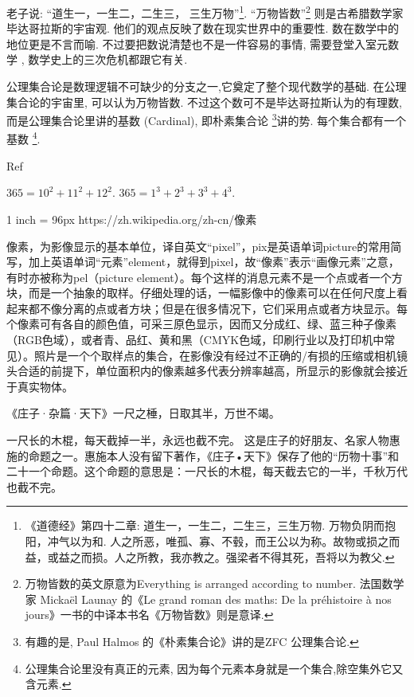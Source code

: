 \documentclass[main.tex]{subfiles}
\begin{document}
老子说: “道生一，一生二，二生三，
三生万物”\footnote{《道德经》第四十二章: 道生一，一生二，二生三，三生万物. 万物负阴而抱阳，冲气以为和. 人之所恶，唯孤、寡、不毂，而王公以为称。故物或损之而益，或益之而损。人之所教，我亦教之。强梁者不得其死，吾将以为教父.}.
“万物皆数”\footnote{万物皆数的英文原意为Everything is arranged according to number. 
	法国数学家 Mickaël Launay 的《Le grand roman des maths: De la préhistoire à nos jours》一书的中译本书名《万物皆数》则是意译.}
则是古希腊数学家毕达哥拉斯的宇宙观. 他们的观点反映了数在现实世界中的重要性. 数在数学中的地位更是不言而喻.
不过要把数说清楚也不是一件容易的事情, 需要登堂入室元数学
, 数学史上的三次危机都跟它有关. 

公理集合论是数理逻辑不可缺少的分支之一,它奠定了整个现代数学的基础. 在公理集合论的宇宙里, 可以认为万物皆数. 
不过这个数可不是毕达哥拉斯认为的有理数, 而是公理集合论里讲的基数 (Cardinal),
即朴素集合论
\footnote{有趣的是, Paul Halmos 的《朴素集合论》讲的是ZFC 公理集合论\cite{HalmosP}.}讲的势. 每个集合都有一个基数
\footnote{公理集合论里没有真正的元素,
因为每个元素本身就是一个集合,除空集外它又含元素.}.

Ref
\cite{JiangJi}


$365=10^2+11^2+12^2$.
$365=1^3+2^3+3^3+4^3$.


1 inch = 96px
https://zh.wikipedia.org/zh-cn/像素

像素，为影像显示的基本单位，译自英文“pixel”，pix是英语单词picture的常用简写，加上英语单词“元素”element，就得到pixel，故“像素”表示“画像元素”之意，有时亦被称为pel（picture element）。每个这样的消息元素不是一个点或者一个方块，而是一个抽象的取样。仔细处理的话，一幅影像中的像素可以在任何尺度上看起来都不像分离的点或者方块；但是在很多情况下，它们采用点或者方块显示。每个像素可有各自的颜色值，可采三原色显示，因而又分成红、绿、蓝三种子像素（RGB色域），或者青、品红、黄和黑（CMYK色域，印刷行业以及打印机中常见）。照片是一个个取样点的集合，在影像没有经过不正确的/有损的压缩或相机镜头合适的前提下，单位面积内的像素越多代表分辨率越高，所显示的影像就会接近于真实物体。


《庄子·杂篇·天下》一尺之棰，日取其半，万世不竭。

一尺长的木棍，每天截掉一半，永远也截不完。
这是庄子的好朋友、名家人物惠施的命题之一。惠施本人没有留下著作，《庄子•天下》保存了他的“历物十事”和二十一个命题。这个命题的意思是：一尺长的木棍，每天截去它的一半，千秋万代也截不完。
\end{document}
